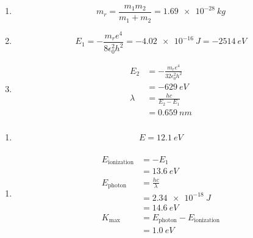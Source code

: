 \documentclass{article}
\begin{document}
\begin{enumerate}
  \item \[m_r = \frac{m_1 m_2}{m_1 + m_2} = \qty{1.69e-28}{kg}\]

  \item \[E_1 = -\frac{m_r e^4}{8 \epsilon_0^2 h^2} = \qty{-4.02e-16}{J} = \qty{-2514}{eV}\]

  \item

        \begin{align*}
          E_2     & = -\frac{m_r e^4}{32 \epsilon_0^2 h^2} \\
                  & = \qty{-629}{eV}                       \\
          \lambda & = \frac{h c}{E_2 - E_1}                \\
                  & = \qty{0.659}{nm}
        \end{align*}
\end{enumerate}

\setcounter{subsubsection}{52}
\subsubsection{}

\begin{enumerate}
  \item \[E = \qty{12.1}{eV}\]
\end{enumerate}

\setcounter{subsubsection}{54}
\subsubsection{}

\begin{enumerate}
  \item

        \begin{align*}
          E_\text{ionization} & = -E_1                                  \\
                              & = \qty{13.6}{eV}                        \\
          E_\text{photon}     & = \frac{h c}{\lambda}                   \\
                              & = \qty{2.34e-18}{J}                     \\
                              & = \qty{14.6}{eV}                        \\
          K_\text{max}        & = E_\text{photon} - E_\text{ionization} \\
                              & = \qty{1.0}{eV}
        \end{align*}
\end{enumerate}
\end{document}
